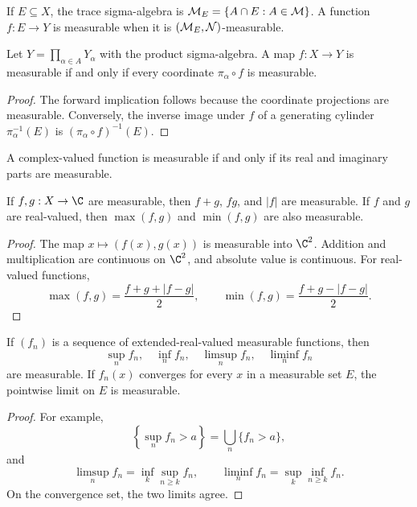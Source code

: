 \begin{de}
If $E\subseteq X$, the trace sigma-algebra is $\mathcal{M}_E=\{A\cap E:A\in\mathcal{M}\}$. A function $f:E\to Y$ is measurable when it is $(\mathcal{M}_E,\mathcal{N})$-measurable.
\end{de}

\begin{prop}
Let $Y=\prod_{\alpha\in A}Y_\alpha$ with the product sigma-algebra. A map $f:X\to Y$ is measurable if and only if every coordinate $\pi_\alpha\circ f$ is measurable.
\end{prop}

\begin{proof}
The forward implication follows because the coordinate projections are measurable. Conversely, the inverse image under $f$ of a generating cylinder $\pi_\alpha^{-1}(E)$ is $(\pi_\alpha\circ f)^{-1}(E)$.
\end{proof}

\begin{cor}
A complex-valued function is measurable if and only if its real and imaginary parts are measurable.
\end{cor}

\begin{prop}
If $f,g:X\to\C$ are measurable, then $f+g$, $fg$, and $|f|$ are measurable. If $f$ and $g$ are real-valued, then $\max(f,g)$ and $\min(f,g)$ are also measurable.
\end{prop}

\begin{proof}
The map $x\mapsto(f(x),g(x))$ is measurable into $\C^2$. Addition and multiplication are continuous on $\C^2$, and absolute value is continuous. For real-valued functions,
\[
\max(f,g)=\frac{f+g+|f-g|}{2},
\qquad
\min(f,g)=\frac{f+g-|f-g|}{2}.
\]
\end{proof}

\begin{prop}[Limits]
If $(f_n)$ is a sequence of extended-real-valued measurable functions, then
\[
\sup_nf_n,\quad \inf_nf_n,\quad \limsup_nf_n,\quad \liminf_nf_n
\]
are measurable. If $f_n(x)$ converges for every $x$ in a measurable set $E$, the pointwise limit on $E$ is measurable.
\end{prop}

\begin{proof}
For example,
\[
\left\{\sup_nf_n>a\right\}=\bigcup_n\{f_n>a\},
\]
and
\[
\limsup_nf_n=\inf_k\sup_{n\geq k}f_n,
\qquad
\liminf_nf_n=\sup_k\inf_{n\geq k}f_n.
\]
On the convergence set, the two limits agree.
\end{proof}

